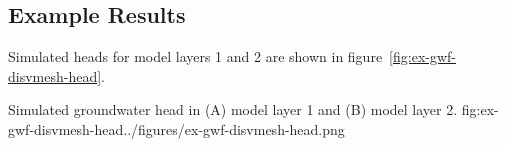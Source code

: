 \subsection{Example Results}

Simulated heads for model layers 1 and 2 are shown in figure~\ref{fig:ex-gwf-disvmesh-head}.  

\begin{StandardFigure}{
                                     Simulated groundwater head in (A) model layer  1 and (B) model layer 2.
                                     }{fig:ex-gwf-disvmesh-head}{../figures/ex-gwf-disvmesh-head.png}
\end{StandardFigure}                                 
